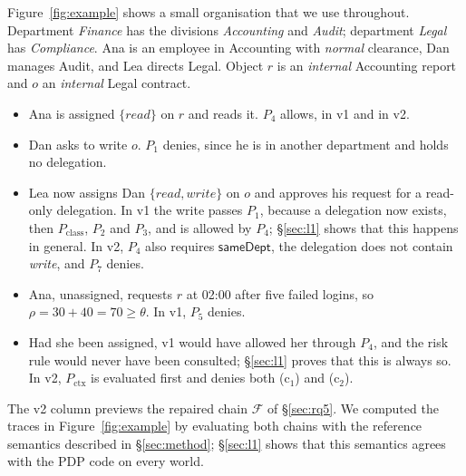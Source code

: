\documentclass[sigconf,review,anonymous]{acmart}
\newcommand{\Pc}{P_{\mathrm{class}}}
\newcommand{\Px}{P_{\mathrm{ctx}}}
\newcommand{\sameDept}{\mathsf{sameDept}}
\begin{document}
Figure~\ref{fig:example} shows a small organisation that we use throughout. Department \emph{Finance} has the
divisions \emph{Accounting} and \emph{Audit}; department \emph{Legal} has \emph{Compliance}. Ana is an
employee in Accounting with \emph{normal} clearance, Dan manages Audit, and Lea directs Legal. Object $r$ is
an \emph{internal} Accounting report and $o$ an \emph{internal} Legal contract.
\begin{itemize}
\item[(a)] Ana is assigned $\{\mathit{read}\}$ on $r$ and reads it. $P_4$ allows, in v1 and in v2.
\item[(b$_1$)] Dan asks to write $o$. $P_1$ denies, since he is in another department and holds no delegation.
\item[(b$_2$)] Lea now assigns Dan $\{\mathit{read},\mathit{write}\}$ on $o$ and approves his request for a
read-only delegation. In v1 the write passes $P_1$, because a delegation now exists, then $\Pc$, $P_2$ and
$P_3$, and is allowed by $P_4$; \S\ref{sec:l1} shows that this happens in general. In v2, $P_4$ also requires $\sameDept$, the
delegation does not contain \emph{write}, and $P_7$ denies.
\item[(c$_1$)] Ana, unassigned, requests $r$ at 02:00 after five failed logins, so
$\rho=30+40=70\ge\theta$. In v1, $P_5$ denies.
\item[(c$_2$)] Had she been assigned, v1 would have allowed her through $P_4$, and the risk rule would never
have been consulted; \S\ref{sec:l1} proves that this is always so. In v2, $\Px$ is evaluated first and denies both (c$_1$) and
(c$_2$).
\end{itemize}
The v2 column previews the repaired chain $\mathcal{F}$ of \S\ref{sec:rq5}. We computed the traces in
Figure~\ref{fig:example} by evaluating both chains with the reference semantics described in \S\ref{sec:method};
\S\ref{sec:l1} shows that this semantics agrees with the PDP code on every world.
\end{document}
